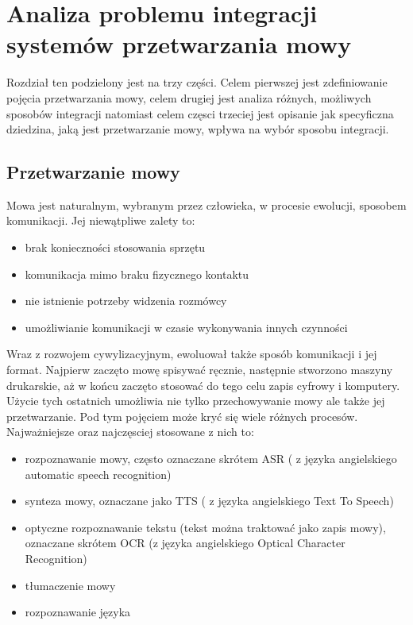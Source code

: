 
\chapter{Analiza problemu integracji systemów przetwarzania mowy} %



\ifpdf
    \graphicspath{{2/figures/PNG/}{2/figures/PDF/}{2/figures/}}
\else
    \graphicspath{{2/figures/EPS/}{2/figures/}}
\fi


Rozdział ten podzielony jest na trzy części. Celem pierwszej jest zdefiniowanie pojęcia przetwarzania mowy, celem drugiej jest analiza różnych, możliwych sposobów integracji natomiast celem częsci trzeciej jest opisanie jak specyficzna dziedzina, jaką jest przetwarzanie mowy, wpływa na wybór sposobu integracji.

\section{Przetwarzanie mowy}
Mowa jest naturalnym, wybranym przez człowieka, w procesie ewolucji, sposobem komunikacji. Jej niewątpliwe zalety to:
\begin{itemize}
	\item brak konieczności stosowania sprzętu
	\item komunikacja mimo braku fizycznego kontaktu
	\item nie istnienie potrzeby widzenia rozmówcy
	\item umożliwianie komunikacji w czasie wykonywania innych czynności
\end{itemize}
Wraz z rozwojem cywylizacyjnym, ewoluował także sposób komunikacji i jej format. Najpierw zaczęto mowę spisywać ręcznie, następnie stworzono maszyny drukarskie, aż w końcu zaczęto stosować do tego celu zapis cyfrowy i komputery. Użycie tych ostatnich umożliwia nie tylko przechowywanie mowy ale także jej przetwarzanie. Pod tym pojęciem może kryć się wiele różnych procesów. Najważniejsze oraz najczęsciej stosowane z nich to:
\begin{itemize}
	\item rozpoznawanie mowy, często oznaczane skrótem ASR ( z języka angielskiego automatic speech recognition)
	\item synteza mowy, oznaczane jako TTS ( z języka angielskiego Text To Speech)
	\item optyczne rozpoznawanie tekstu (tekst można traktować jako zapis mowy), oznaczane skrótem OCR (z języka angielskiego Optical Character Recognition)
	\item tłumaczenie mowy
	\item rozpoznawanie języka
\end{itemize} 
